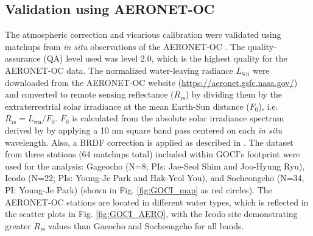 \documentclass[]{interact}
\theoremstyle{plain}%
\theoremstyle{definition}
\theoremstyle{remark}
\begin{document}
\subsection{Validation using AERONET-OC}
The atmospheric correction and vicarious calibration were validated using matchups from {\it in situ} observations of the AERONET-OC \citep{Zibordi2009}. The quality-assurance (QA) level used was level 2.0, which is the highest quality for the AERONET-OC data. 
The normalized water-leaving radiance $L_\text{wn}$ were downloaded from the AERONET-OC website (\url{https://aeronet.gsfc.nasa.gov/}) and converted to remote sensing reflectance ($R_\text{rs}$) by dividing them by the extraterrestrial solar irradiance at the mean Earth-Sun distance ($F_\text{0}$), i.e. $R_\text{rs}=L_\text{wn}/F_\text{0}$. $F_\text{0}$ is calculated from the absolute solar irradiance spectrum derived by \cite{Thuillier2003} by applying a 10 nm square band pass centered on each {\it in situ} wavelength. Also, a BRDF correction is applied as described in \cite{Bailey2006}. 
The dataset from three stations (64 matchups total) included within GOCI's footprint were used for the analysis: Gageocho (N=8; PIs: Jae-Seol Shim and Joo-Hyung Ryu), Ieodo (N=22; PIs: Young-Je Park and Hak-Yeol You), and Socheongcho (N=34, PI: Young-Je Park) (shown in Fig. \ref{fig:GOCI_map} as red circles). The AERONET-OC stations are located in different water types, which is reflected in the scatter plots in Fi{}g. \ref{fig:GOCI_AERO}, with the Ieodo site demonstrating greater $R_\text{rs}$ values than Gaeocho and Socheongcho for all bands. 

\end{document}
